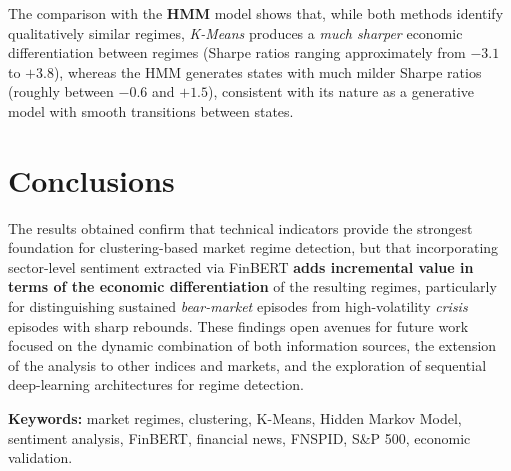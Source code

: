 The comparison with the \textbf{HMM} model shows that, while both methods
identify qualitatively similar regimes, \textit{K-Means} produces a
\emph{much sharper} economic differentiation between regimes (Sharpe
ratios ranging approximately from $-3.1$ to $+3.8$), whereas the HMM
generates states with much milder Sharpe ratios (roughly between $-0.6$
and $+1.5$), consistent with its nature as a generative model with smooth
transitions between states.

\section*{Conclusions}

The results obtained confirm that technical indicators provide the
strongest foundation for clustering-based market regime detection, but
that incorporating sector-level sentiment extracted via FinBERT
\textbf{adds incremental value in terms of the economic differentiation}
of the resulting regimes, particularly for distinguishing sustained
\emph{bear-market} episodes from high-volatility \emph{crisis} episodes
with sharp rebounds. These findings open avenues for future work focused
on the dynamic combination of both information sources, the extension of
the analysis to other indices and markets, and the exploration of
sequential deep-learning architectures for regime detection.

\vspace{1cm}
\noindent\textbf{Keywords:} market regimes, clustering, K-Means, Hidden
Markov Model, sentiment analysis, FinBERT, financial news, FNSPID, S\&P
500, economic validation.

\clearpage
